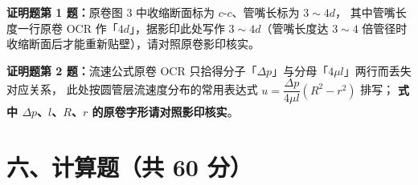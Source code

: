 \begin{tishi}
\textbf{证明题第 1 题：}原卷图 3 中收缩断面标为 $c$-$c$、管嘴长标为 $3\sim4d$，
其中管嘴长度一行原卷 OCR 作「$4d$」，据影印此处写作 $3\sim4d$（管嘴长度达 $3\sim4$ 倍管径时
收缩断面后才能重新贴壁），请对照原卷影印核实。

\textbf{证明题第 2 题：}流速公式原卷 OCR 只拾得分子「$\Delta p$」与分母「$4\mu l$」两行而丢失对应关系，
此处按圆管层流速度分布的常用表达式 $u=\dfrac{\Delta p}{4\mu l}(R^{2}-r^{2})$ 排写；
\textbf{式中 $\Delta p$、$l$、$R$、$r$ 的原卷字形请对照影印核实}。
\end{tishi}

\section{六、计算题（共 60 分）}

